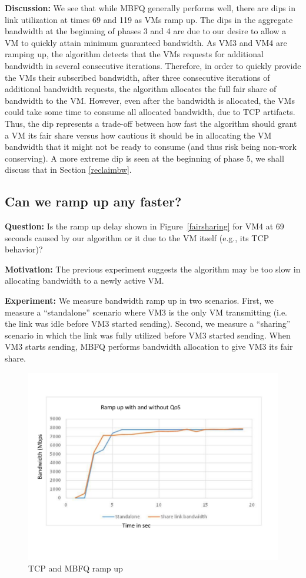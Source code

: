{\bf Discussion:} We see that while MBFQ generally performs well, there are dips
in link utilization at times 69 and 119 as VMs ramp up. The dips in the aggregate
bandwidth at the beginning of phases 3
and 4 are due to our desire to allow a VM to quickly attain minimum
guaranteed bandwidth. As VM3 and VM4 are ramping up, the algorithm detects that
the VMs requests for additional bandwidth in several consecutive iterations.
Therefore, in order to quickly provide the VMs their subscribed bandwidth, after
three consecutive iterations of additional bandwidth requests, the algorithm
allocates the full fair share of bandwidth to the VM. However, even after
    the bandwidth is allocated, the VMs could take some time to consume all allocated
bandwidth, due to
TCP artifacts. Thus, the dip represents a trade-off between how fast the
algorithm should grant a VM its fair share versus how cautious it should be in
allocating the VM bandwidth that it might not be ready to consume (and thus risk
being non-work conserving). A more extreme dip is seen at the
beginning of phase 5, we shall discuss that in Section \ref{reclaimbw}.

\subsection{Can we ramp up any faster?}

{\bf Question:}  Is the ramp up delay shown in Figure~\ref{fairsharing} for VM4
at 69 seconds caused by our algorithm or it due to the VM itself (e.g., its TCP
behavior)?

{\bf Motivation:} The previous experiment suggests the algorithm may be too slow
in allocating bandwidth to a newly active VM.  

{\bf Experiment:} We measure bandwidth ramp up in two scenarios.  First, we
measure a  ``standalone'' scenario where VM3 is the only VM transmitting (i.e. the link
was idle before VM3 started sending).  Second, we measure a  ``sharing'' scenario
in which the link was fully utilized before VM3 started sending. When VM3 starts
sending, MBFQ performs bandwidth allocation to give VM3 its fair share.

\begin{figure}[h]
\centering
\includegraphics[width=0.7\columnwidth,trim=60pt 40mm 0pt 8mm]{figures/rampupcomparison}
\caption{TCP and MBFQ ramp up}
\label{rampupcomparison}
\vspace{-3mm}
\end{figure}

